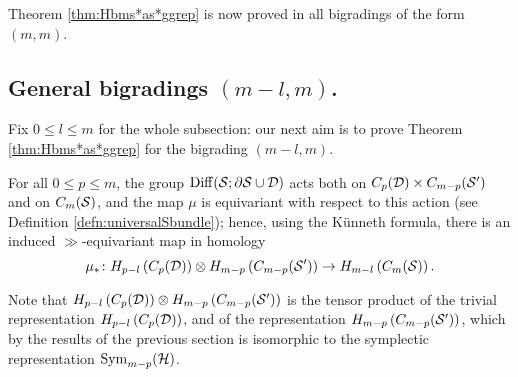 Theorem \ref{thm:Hbms*as*ggrep} is now proved in all bigradings of the form $(m,m)$.

\subsection{General bigradings $(m-l,m)$.} Fix $0\leq l\leq m$ for the whole subsection: our next aim is to prove Theorem
\ref{thm:Hbms*as*ggrep} for the bigrading $(m-l,m)$.
%  
%  
% 

For all $0\leq p\leq m$, the group $\operatorname{Diff}(\mathcal{S};\partial\mathcal{S}\cup\mathcal{D})$ acts both on $C_p(\mathcal{D})\times C_{m-p}(\mathcal{S}')$
and on $C_m(\mathcal{S})$, and the map $\mu$ is equivariant with respect to this action
(see Definition \ref{defn:universalSbundle});
hence, using the K\"{u}nneth formula, there is an induced $\gg$-equivariant map in homology
\begin{equation}
 \label{eq:mu*}
 \mu_*\colon H_{p-l}\left(C_p(\mathcal{D})\right)\otimes H_{m-p}\left(C_{m-p}(\mathcal{S}')\right)\to H_{m-l}\left(C_m(\mathcal{S})\right).
\end{equation}

Note that $H_{p-l}\left(C_p(\mathcal{D})\right)\otimes H_{m-p}\left(C_{m-p}(\mathcal{S}')\right)$
is the tensor product of the trivial representation $H_{p-l}\left(C_p(\mathcal{D})\right)$, and
of the representation $H_{m-p}\left(C_{m-p}(\mathcal{S}')\right)$, which by the results of the previous
section is isomorphic to the symplectic representation $\operatorname{Sym}_{m-p}(\mathcal{H})$.

